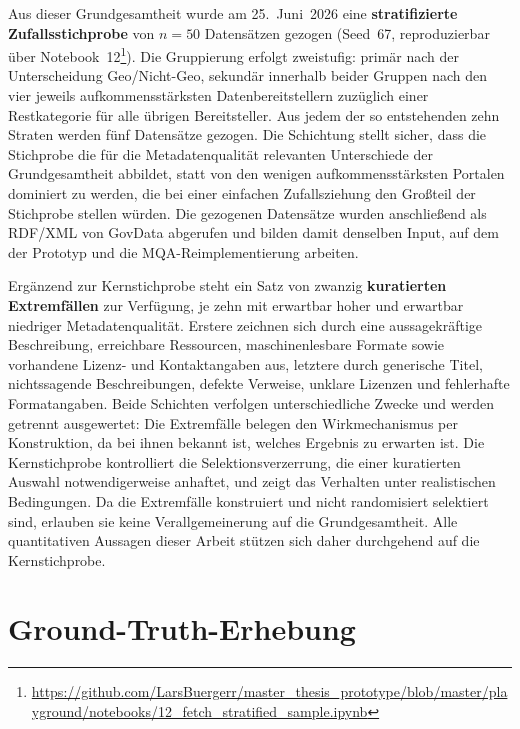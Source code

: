 Aus dieser Grundgesamtheit wurde am 25.~Juni~2026 eine \textbf{stratifizierte
Zufallsstichprobe} von $n = 50$ Datensätzen gezogen (Seed~67, reproduzierbar über
Notebook~12\footnote{\url{https://github.com/LarsBuergerr/master_thesis_prototype/blob/master/playground/notebooks/12_fetch_stratified_sample.ipynb}}). Die Gruppierung erfolgt zweistufig: primär nach der Unterscheidung
Geo/Nicht-Geo, sekundär innerhalb beider Gruppen nach den vier jeweils
aufkommensstärksten Datenbereitstellern zuzüglich einer Restkategorie für alle übrigen
Bereitsteller. Aus jedem der so entstehenden zehn Straten werden fünf Datensätze gezogen.
Die Schichtung stellt sicher, dass die Stichprobe die für die Metadatenqualität
relevanten Unterschiede der Grundgesamtheit abbildet, statt von den wenigen
aufkommensstärksten Portalen dominiert zu werden, die bei einer einfachen Zufallsziehung
den Großteil der Stichprobe stellen würden. Die gezogenen Datensätze wurden anschließend
als RDF/XML von GovData abgerufen und bilden damit denselben Input, auf dem der Prototyp 
und die MQA-Reimplementierung arbeiten.

Ergänzend zur Kernstichprobe steht ein Satz von zwanzig \textbf{kuratierten Extremfällen}
zur Verfügung, je zehn mit erwartbar hoher und erwartbar niedriger Metadatenqualität.
Erstere zeichnen sich durch eine aussagekräftige Beschreibung, erreichbare Ressourcen,
maschinenlesbare Formate sowie vorhandene Lizenz- und Kontaktangaben aus, letztere durch
generische Titel, nichtssagende Beschreibungen, defekte Verweise, unklare Lizenzen und
fehlerhafte Formatangaben. Beide Schichten verfolgen unterschiedliche Zwecke und werden 
getrennt ausgewertet: Die Extremfälle belegen den Wirkmechanismus per
Konstruktion, da bei ihnen bekannt ist, welches Ergebnis zu erwarten ist. Die
Kernstichprobe kontrolliert die Selektionsverzerrung, die einer kuratierten Auswahl
notwendigerweise anhaftet, und zeigt das Verhalten unter realistischen Bedingungen.
Da die Extremfälle konstruiert und nicht randomisiert selektiert sind, erlauben sie keine
Verallgemeinerung auf die Grundgesamtheit. Alle quantitativen Aussagen dieser Arbeit
stützen sich daher durchgehend auf die Kernstichprobe.

\section{Ground-Truth-Erhebung}
\label{sec:eval_gt_erhebung}


